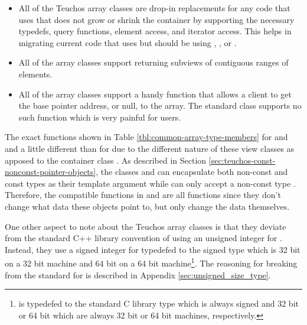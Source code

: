 \documentclass[pdf,ps2pdf,11pt]{SANDreport}
\begin{document}
\begin{itemize}

{}\item{}All of the Teuchos array classes are drop-in replacements for
any code that uses {} that does not grow or shrink
the container by supporting the necessary typedefs, query functions,
element access, and iterator access.  This helps in migrating current
code that uses {} but should be using
{}, {}, {} or
{}.

{}\item{}All of the array classes support returning 
subviews of contiguous ranges of elements.

{}\item{}All of the array classes support a handy
{} function that allows a client to get the base
pointer address, or null, to the array.  The standard
{} class supports no such function which is very
painful for users.

\end{itemize}

The exact functions shown in Table
{}\ref{tbl:common-array-type-members} for {} and
{} and a little different than for {}
due to the different nature of these view classes as apposed to the
container class {}.  As described in Section
{}\ref{sec:teuchos-const-nonconst-pointer-objects}, the classes
{} and {} can encapsulate both
non-const and const types {} as their template argument
while {} can only accept a non-const type {}.
Therefore, the {} compatible functions in
{} and {} are all {}
functions since they don't change what data these objects point to,
but only change the data themselves.

One other aspect to note about the Teuchos array classes is that they
deviate from the standard C++ library convention of using an unsigned
integer for {}.  Instead, they use a signed integer
for {} typedefed to the signed type
{} which is 32 bit on a 32 bit machine and 64
bit on a 64 bit machine\footnote{{} is
typedefed to the standard C library type {} which
is always signed and 32 bit or 64 bit which are always 32 bit or 64
bit machines, respectively.}.  The reasoning for breaking from the
{} standard for {} is described
in Appendix {}\ref{sec:unsigned_size_type}.
\end{document}
